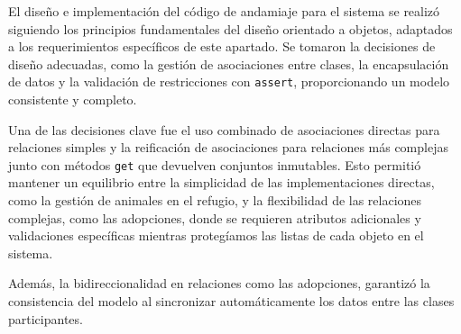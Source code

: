 El diseño e implementación del código de andamiaje para el sistema se realizó siguiendo 
los principios fundamentales del diseño orientado a objetos, adaptados a los requerimientos 
específicos de este apartado. Se tomaron la decisiones de diseño adecuadas, como la gestión 
de asociaciones entre clases, la encapsulación de datos y la validación de restricciones con \texttt{assert}, 
proporcionando un modelo consistente y completo.\par
\vspace{0.15cm}
Una de las decisiones clave fue el uso combinado de asociaciones directas para relaciones 
simples y la reificación de asociaciones para relaciones más complejas junto con métodos \texttt{get}
que devuelven conjuntos inmutables. Esto permitió mantener un equilibrio entre la simplicidad de las 
implementaciones directas, como la gestión de animales en el refugio, y la flexibilidad 
de las relaciones complejas, como las adopciones, donde se requieren atributos adicionales 
y validaciones específicas mientras protegíamos las listas de cada objeto en el sistema.\par
\vspace{0.15cm}
Además, la bidireccionalidad en relaciones como las adopciones, garantizó la 
consistencia del modelo al sincronizar automáticamente los datos entre las
clases participantes.\par

\newpage
